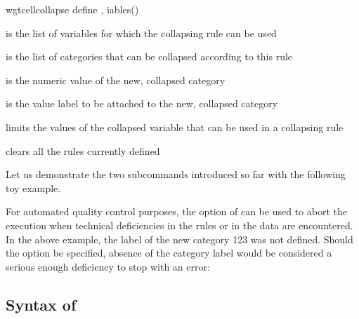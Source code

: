 \begin{stsyntax}
wgtcellcollapse define
,
iables(\varlist)
\end{stsyntax}

\hangpara
{} is the list of variables for which the collapsing rule can be used

\hangpara
{} is the list of categories that can be collapsed according to this rule

\hangpara
{} is the numeric value of the new, collapsed category

\hangpara
{} is the value label to be attached to the new, collapsed category

\hangpara
{} limits the values of the collapsed variable that can be used in a collapsing rule

\hangpara
{} clears all the rules currently defined

\bigskip

Let us demonstrate the two subcommands introduced so far with the following toy example.

\begin{stlog}
\nullskip
\end{stlog}

For automated quality control purposes, the  option
of  can be used to abort the execution
when technical deficiencies in the rules or in the data are encountered.
In the above example, the label of the new category 123 was not defined.
Should the  option be specified,
absence of the category label would be considered a serious enough 
deficiency to stop with an error:

\begin{stlog}
\nullskip
\end{stlog}

\subsection{Syntax of }



